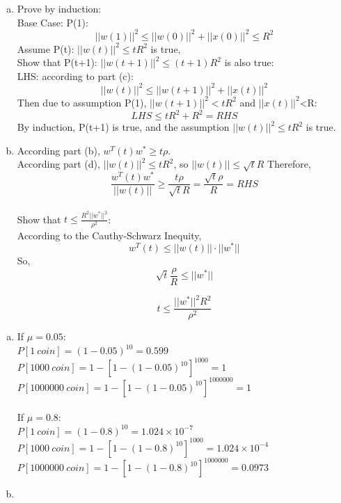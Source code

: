 \documentclass[11pt]{article}
\begin{document}
\begin{enumerate} [(a)]
\item Prove by induction:\\
Base Case: P(1):\[
||w(1)||^2 \leq ||w(0)||^2+||x(0)||^2 \leq R^2
\]
Assume P(t): $||w(t)||^2 \leq tR^2$ is true,\\
Show that P(t+1): $||w(t+1)||^2 \leq (t+1)R^2$ is also true:\\
LHS: according to part (c):\[
||w(t)||^2\leq ||w(t+1)||^2+||x(t)||^2 
\]
Then due to assumption P(1), $||w(t+1)||^2 < tR^2$ and $||x(t)||^2$<R:
\[
LHS \leq tR^2+R^2 = RHS
\]
By induction, P(t+1) is true, and the assumption $||w(t)||^2 \leq tR^2$ is true. 

\item According part (b), $w^T(t)w^*\geq t\rho$.\\
According part (d), $||w(t)||^2\leq tR^2$, so $||w(t)||\leq \sqrt{t}R$
Therefore, \[
\frac{w^T(t)w^*}{||w(t)||} \geq \frac{t\rho}{\sqrt{t}R}=\frac{\sqrt{t}\rho}{R}=RHS
\]
\\
Show that $t\leq\frac{R^2||w^*||^2}{\rho^2}$:\\
According to the Cauthy-Schwarz Inequity,
\[
w^T(t)\leq||w(t)||\cdot||w^*||
\]
So,
\[
\sqrt{t}\frac{\rho}{R}\leq||w^*||
\]

\[
t\leq\frac{||w^*||^2R^2}{\rho^2}
\]
\end{enumerate}
\newpage
{}
\begin{enumerate} [(a)]
\item If $\mu=0.05$:\\
$P[1\ coin]=(1-0.05)^{10}=0.599$\\
$P[1000\ coin]=1-[1-(1-0.05)^{10}]^{1000}=1$\\
$P[1000000\ coin]=1-[1-(1-0.05)^{10}]^{1000000}=1$
\\\\
If $\mu=0.8$:\\
$P[1\ coin]=(1-0.8)^{10}=1.024\times10^{-7}$\\
$P[1000\ coin]=1-[1-(1-0.8)^{10}]^{1000}=1.024\times10^{-4}$\\
$P[1000000\ coin]=1-[1-(1-0.8)^{10}]^{1000000}=0.0973$

\item \ \\\begin{figure}[htb]        
\end{figure}


\end{enumerate}
\end{document}
